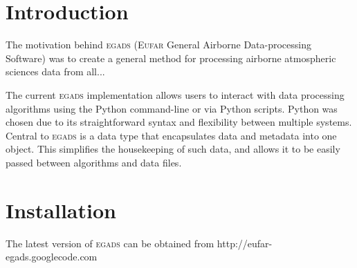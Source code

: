 \documentclass[a4paper,11pt]{report}
\newcommand{\egads}{\textsc{egads} }
\begin{document}
\renewcommand{\thepage}{\roman{page}}






\tableofcontents
\pagebreak


\renewcommand{\thepage}{\arabic{page}}
\setcounter{page}{1}

\chapter{Introduction}

The motivation behind \egads (\textsc{Eufar} General Airborne Data-processing Software) was to create a general method for processing airborne atmospheric sciences data from all...

The current \egads implementation allows users to interact with data processing algorithms using the Python command-line or via Python scripts. Python was chosen due to its straightforward syntax and flexibility between multiple systems. Central to \egads is a data type that encapsulates data and metadata into one object. This simplifies the housekeeping of such data, and allows it to be easily passed between algorithms and data files.




\chapter{Installation}

The latest version of \egads can be obtained from http://eufar-egads.googlecode.com
\end{document}
